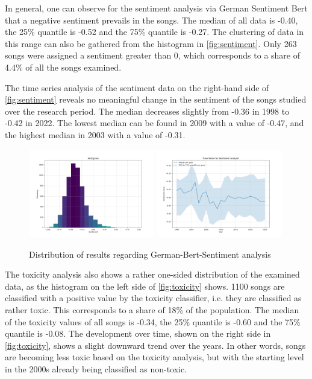In general, one can observe for the sentiment analysis via German Sentiment Bert that a negative sentiment prevails in the songs. The median of all data is -0.40, the 25\% quantile is -0.52 and the 75\% quantile is -0.27. The clustering of data in this range can also be gathered from the histogram in \autoref{fig:sentiment}. Only 263 songs were assigned a sentiment greater than 0, which corresponds to a share of 4.4\% of all the songs examined. 

The time series analysis of the sentiment data on the right-hand side of \autoref{fig:sentiment} reveals no meaningful change in the sentiment of the songs studied over the research period. The median decreases slightly from -0.36 in 1998 to -0.42 in 2022. The lowest median can be found in 2009 with a value of -0.47, and the highest median in 2003 with a value of -0.31.

\begin{figure}[!htb]
    \centering
    \includegraphics[width=0.49\textwidth]{figures/sentiment_histogram.png}
    \includegraphics[width=0.49\textwidth]{figures/time_series_sentiment.png}
    \caption{Distribution of results regarding German-Bert-Sentiment analysis}
    \label{fig:sentiment}
\end{figure}

The toxicity analysis also shows a rather one-sided distribution of the examined data, as the histogram on the left side of \autoref{fig:toxicity} shows. 1100 songs are classified with a positive value by the toxicity classifier, i.e. they are classified as rather toxic. This corresponds to a share of 18\% of the population. The median of the toxicity values of all songs is -0.34, the 25\% quantile is -0.60 and the 75\% quantile is -0.08. The development over time, shown on the right side in \autoref{fig:toxicity}, shows a slight downward trend over the years. In other words, songs are becoming less toxic based on the toxicity analysis, but with the starting level in the 2000s already being classified as non-toxic.

